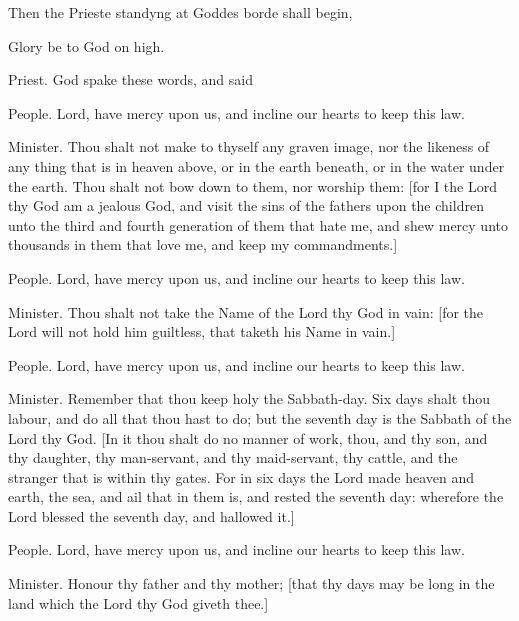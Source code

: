 Then the Prieste standyng at Goddes borde shall begin,

Glory be to God on high.



Priest.  God spake these words, and said

People. Lord, have mercy upon us, and incline our hearts to keep this law.

Minister. Thou shalt not make to thyself any graven image, nor the likeness of any thing that is in heaven above, or in the earth beneath, or in the water under the earth. Thou shalt not bow down to them, nor worship them: [for I the Lord thy God am a jealous God, and visit the sins of the fathers upon the children unto the third and fourth generation of them that hate me, and shew mercy unto thousands in them that love me, and keep my commandments.]

People. Lord, have mercy upon us, and incline our hearts to keep this law.

Minister. Thou shalt not take the Name of the Lord thy God in vain: [for the Lord will not hold him guiltless, that taketh his Name in vain.]

People. Lord, have mercy upon us, and incline our hearts to keep this law.

Minister. Remember that thou keep holy the Sabbath-day. Six days shalt thou labour, and do all that thou hast to do; but the seventh day is the Sabbath of the Lord thy God. [In it thou shalt do no manner of work, thou, and thy son, and thy daughter, thy man-servant, and thy maid-servant, thy cattle, and the stranger that is within thy gates. For in six days the Lord made heaven and earth, the sea, and ail that in them is, and rested the seventh day: wherefore the Lord blessed the seventh day, and hallowed it.]

People. Lord, have mercy upon us, and incline our hearts to keep this law.

Minister. Honour thy father and thy mother; [that thy days may be long in the land which the Lord thy God giveth thee.]

